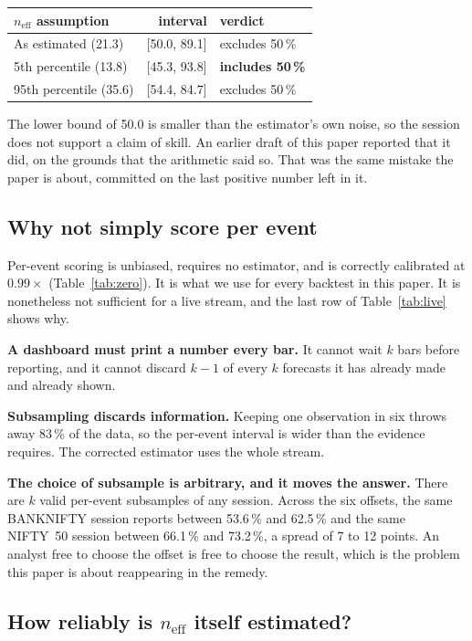 \documentclass[conference]{IEEEtran}
\begin{document}
\begin{center}
\footnotesize
\begin{tabular}{@{}lrl@{}}
\toprule
$n_{\text{eff}}$ assumption & interval & verdict \\
\midrule
As estimated (21.3) & [50.0, 89.1] & excludes 50\,\% \\
5th percentile (13.8) & [45.3, 93.8] & \textbf{includes 50\,\%} \\
95th percentile (35.6) & [54.4, 84.7] & excludes 50\,\% \\
\bottomrule
\end{tabular}
\end{center}

The lower bound of 50.0 is smaller than the estimator's own noise, so the
session does not support a claim of skill. An earlier draft of this paper
reported that it did, on the grounds that the arithmetic said so. That was the
same mistake the paper is about, committed on the last positive number left in
it.

\subsection{Why not simply score per event}

Per-event scoring is unbiased, requires no estimator, and is correctly
calibrated at $0.99\times$ (Table~\ref{tab:zero}). It is what we use for every
backtest in this paper. It is nonetheless not sufficient for a live stream, and
the last row of Table~\ref{tab:live} shows why.

\textbf{A dashboard must print a number every bar.} It cannot wait $k$ bars
before reporting, and it cannot discard $k-1$ of every $k$ forecasts it has
already made and already shown.

\textbf{Subsampling discards information.} Keeping one observation in six
throws away 83\,\% of the data, so the per-event interval is wider than the
evidence requires. The corrected estimator uses the whole stream.

\textbf{The choice of subsample is arbitrary, and it moves the answer.} There
are $k$ valid per-event subsamples of any session. Across the six offsets, the
same BANKNIFTY session reports between 53.6\,\% and 62.5\,\% and the same
NIFTY~50 session between 66.1\,\% and 73.2\,\%, a spread of 7 to 12 points. An
analyst free to choose the offset is free to choose the result, which is the
problem this paper is about reappearing in the remedy.

\subsection{How reliably is $n_{\text{eff}}$ itself estimated?}
\end{document}
